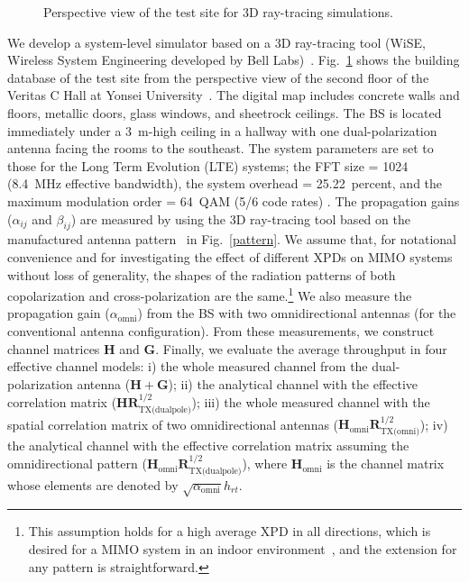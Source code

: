 \documentclass[journal]{IEEEtran}
\begin{document}
\begin{figure}[!t]
\caption{Perspective view of the test site for 3D ray-tracing simulations.}
\label{raytracing}
\end{figure}


We develop a system-level simulator based on a 3D ray-tracing tool (WiSE, Wireless System Engineering developed by Bell Labs)~\cite{WiSE_VTC98}. Fig.~\ref{raytracing} shows the building database of the test site from the perspective view of the second floor of the Veritas C Hall at Yonsei University~\cite{Lim_Mapbased}. The digital map includes concrete walls and floors, metallic doors, glass windows, and sheetrock ceilings. The BS is located immediately under a 3~m-high ceiling in a hallway with one dual-polarization antenna facing the rooms to the southeast. The system parameters are set to those for the Long Term Evolution (LTE) systems; the FFT size = 1024 (8.4~MHz effective bandwidth), the system overhead = 25.22~percent, and the maximum modulation order = 64~QAM (5/6 code rates) \cite{Baker_LTE12}. The propagation gains ($\alpha_{ij}$ and $\beta_{ij}$) are measured by using the 3D ray-tracing tool based on the manufactured antenna pattern~\cite{ManufDP} in Fig.~\ref{pattern}. We assume that, for notational convenience and for investigating the effect of different XPDs on MIMO systems without loss of generality, the shapes of the radiation patterns of both copolarization and cross-polarization are the same.\footnote{This assumption holds for a high average XPD in all directions, which is desired for a MIMO system in an indoor environment~\cite{ManufDP}, and the extension for any pattern is straightforward.} We also measure the propagation gain ($\alpha_\text{omni}$) from the BS with two omnidirectional antennas (for the conventional antenna configuration). 
From these measurements, we construct channel matrices $\pmb{H}$ and $\pmb{G}$. 
Finally, we evaluate the average throughput in four effective channel models: i) the whole measured channel from the dual-polarization antenna ($\pmb{H}+\pmb{G}$); ii) the analytical channel with the effective correlation matrix ($\pmb{H}\pmb{R}_\text{TX(dualpole)}^{1/2}$); iii) the whole measured channel with the spatial correlation matrix of two omnidirectional antennas ($\pmb{H}_\text{omni}\pmb{R}_\text{TX(omni)}^{1/2}$); iv) the analytical channel with the effective correlation matrix assuming the omnidirectional pattern ($\pmb{H}_\text{omni}\pmb{R}_\text{TX(dualpole)}^{1/2}$), where $\pmb{H}_\text{omni}$ is the channel matrix whose elements are denoted by $\sqrt{\alpha_\text{omni}}h_{rt}$.
\end{document}
